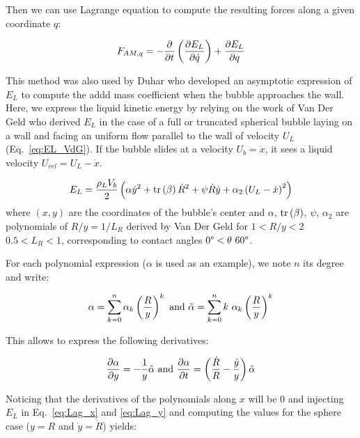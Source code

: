 Then we can use Lagrange equation to compute the resulting forces along a given coordinate $q$:


\begin{align}
\label{eq:Lag_x}
F_{AM,q}&=-\frac{\partial }{\partial t}\left( \frac{\partial E_{L}}{\partial \dot{q}} \right)+\frac{\partial E_{L}}{\partial q}\\
\end{align}


This method was also used by Duhar \cite{duhar_dynamics_2006} who developed an asymptotic expression of $E_{L}$ to compute the addd mass coefficient when the bubble approaches the wall. Here, we express the liquid kinetic energy by relying on the work of Van Der Geld \cite{van_der_geld_dynamics_2009} who derived $E_{L}$ in the case of a full or truncated spherical bubble laying on a wall and facing an uniform flow parallel to the wall of velocity $U_{L}$ (Eq.~\ref{eq:EL_VdG}). If the bubble slides at a velocity $U_{b}=\dot{x}$, it sees a liquid velocity $U_{rel}=U_{L}-\dot{x}$.

\begin{align}
E_{L}=\frac{\rho_{L}V_{b}}{2}\left( \alpha \dot{y}^{2} +\mathrm{tr}\left( \beta \right)\dot{R}^{2}+\psi \dot{R}\dot{y} +\alpha_{2} \left( U_{L}-\dot{x} \right)^{2}  \right)
\label{eq:EL_VdG}
\end{align}
where $(x,y)$ are the coordinates of the bubble's center and $\alpha$, $\mathrm{tr}\left( \beta \right)$, $\psi$, $\alpha_{2}$ are polynomials of $R/y = 1/L_{R}$ derived by Van Der Geld for $1<R/y<2$ \ie $0.5<L_{R}<1$, corresponding to contact angles $0\degree < \theta \ 60\degree$.

For each polynomial expression ($\alpha$ is used as an example), we note $n$ its degree and write:

\begin{equation}
\alpha = \sum_{k=0}^{n}\alpha_{k}\parth{\frac{R}{y} }^{k}\ \text{and}\ \tilde{\alpha}= \sum_{k=0}^{n}k\ \alpha_{k}\parth{\frac{R}{y} }^{k}
\end{equation}

This allows to express the following derivatives:

\begin{equation}
\frac{\partial \alpha}{\partial y} = -\frac{1}{y} \tilde{\alpha}\ \text{and}\ \frac{\partial \alpha}{\partial t} = \left( \frac{\dot{R}}{R} - \frac{\dot{y}}{y} \right) \tilde{\alpha}
\end{equation}


Noticing that the derivatives of the polynomials along $x$ will be 0 and injecting $E_{L}$ in Eq.~\ref{eq:Lag_x} and \ref{eq:Lag_y} and computing the values for the sphere case ($y=R$ and $\dot{y} = \dot{R}$) yields:

